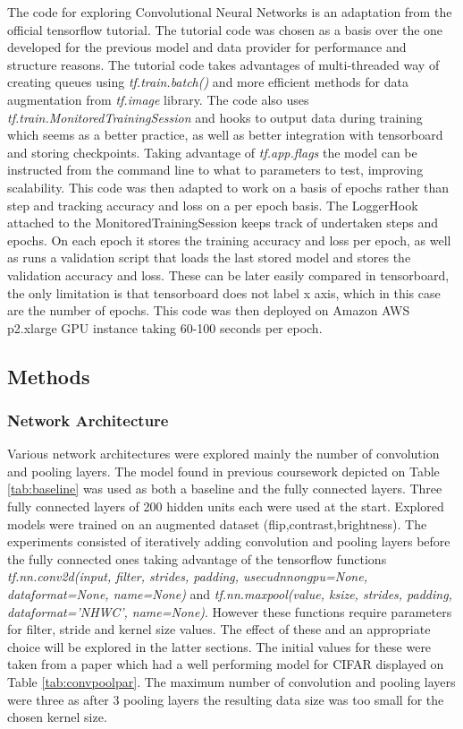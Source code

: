 \documentclass[12pt]{article}
\begin{document}
The code for exploring Convolutional Neural Networks is an adaptation from the official tensorflow tutorial\cite{tf}. The tutorial code was chosen as a basis over the one developed for the previous model and data provider for performance and structure reasons. The tutorial code takes advantages of multi-threaded way of creating queues using \textit{tf.train.batch()} and more efficient methods for data augmentation from \textit{tf.image} library. The code also uses \textit{tf.train.MonitoredTrainingSession} and hooks to output data during training which seems as a better practice, as well as better integration with tensorboard and storing checkpoints. Taking advantage of \textit{tf.app.flags} the model can be instructed from the command line to what to parameters to test, improving scalability.  This code was then adapted to work on a basis of epochs rather than step and tracking accuracy and loss on a per epoch basis. The LoggerHook attached to the MonitoredTrainingSession keeps track of undertaken steps and epochs. On each epoch it stores the training accuracy and loss per epoch, as well as runs a validation script that loads the last stored model and stores the validation accuracy and loss. These can be later easily compared in tensorboard, the only limitation is that tensorboard does not label x axis, which in this case are the number of epochs. This code was then deployed on Amazon AWS p2.xlarge GPU instance taking 60-100 seconds per epoch. 



\subsection*{Methods}

\subsubsection*{Network Architecture}

Various network architectures were explored mainly the number of convolution and pooling layers. The model found in previous coursework depicted on Table \ref{tab:baseline} was used as both a baseline and the fully connected layers. Three fully connected layers of 200 hidden units each were used at the start. Explored models were trained on an augmented dataset (flip,contrast,brightness). The experiments consisted of iteratively adding convolution and pooling layers before the fully connected ones taking advantage of the tensorflow functions \textit{tf.nn.conv2d(input, filter, strides, padding, usecudnnongpu=None, dataformat=None, name=None)} and \textit{tf.nn.maxpool(value, ksize, strides, padding, dataformat='NHWC', name=None)}. However these functions require parameters for filter, stride and kernel size values. The effect of these and an appropriate choice will be explored in the latter sections. The initial values for these were taken from a paper which had a well performing model for CIFAR \cite{inspiration} displayed on Table \ref{tab:convpoolpar}. The maximum number of convolution and pooling layers were three as after 3 pooling layers the resulting data size was too small for the chosen kernel size. 
\end{document}

